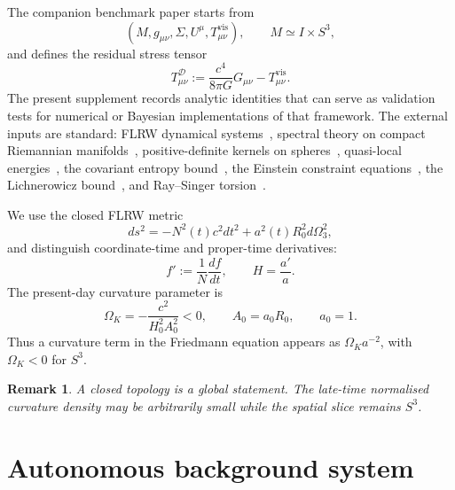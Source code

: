 \documentclass[
  aps,
  prd,
  reprint,
  superscriptaddress,
  nofootinbib,
  floatfix,
  longbibliography
]{revtex4-2}
\newtheorem{remark}{Remark}
\newcommand{\D}{\mathcal D}
\newcommand{\vis}{\mathrm{vis}}
\begin{document}
The companion benchmark paper starts from
\begin{equation}
  (M,g_{\mu\nu},\Sigma,U^\mu,T^\vis_{\mu\nu}),\qquad
  M\simeq I\times S^3,
\end{equation}
and defines the residual stress tensor
\begin{equation}
  T^\D_{\mu\nu}:=\frac{c^4}{8\pi G}G_{\mu\nu}-T^\vis_{\mu\nu}.
  \label{eq:residual}
\end{equation}
The present supplement records analytic identities that can serve as validation
tests for numerical or Bayesian implementations of that framework.
The external inputs are standard: FLRW dynamical systems~\cite{WainwrightEllis1997}, spectral theory on compact Riemannian manifolds~\cite{Berger1971,Rosenberg1997}, positive-definite kernels on spheres~\cite{Schoenberg1942}, quasi-local energies~\cite{BrownYork1993,MisnerSharp1964}, the covariant entropy bound~\cite{Bousso2002}, the Einstein constraint equations~\cite{Wald1984}, the Lichnerowicz bound~\cite{Lichnerowicz1958}, and Ray--Singer torsion~\cite{RaySinger1971}.

We use the closed FLRW metric
\begin{equation}
  ds^2=-N^2(t)c^2dt^2+a^2(t)R_0^2d\Omega_3^2,
\end{equation}
and distinguish coordinate-time and proper-time derivatives:
\begin{equation}
  f':=\frac{1}{N}\frac{df}{dt},\qquad H=\frac{a'}{a}.
  \label{eq:proper}
\end{equation}
The present-day curvature parameter is
\begin{equation}
  \Omega_K=-\frac{c^2}{H_0^2A_0^2}<0,\qquad A_0=a_0R_0,\qquad a_0=1 .
  \label{eq:OmegaK}
\end{equation}
Thus a curvature term in the Friedmann equation appears as \(\Omega_K a^{-2}\),
with \(\Omega_K<0\) for \(S^3\).

\begin{remark}
A closed topology is a global statement.  The late-time normalised curvature
density may be arbitrarily small while the spatial slice remains \(S^3\).
\end{remark}

\section{Autonomous background system}
\label{sec:phase}
\end{document}
